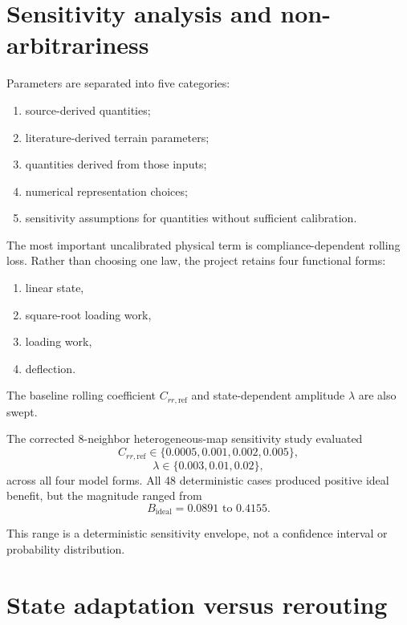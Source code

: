 \documentclass[11pt]{article}
\begin{document}
\section{Sensitivity analysis and non-arbitrariness}

Parameters are separated into five categories:
\begin{enumerate}[label=(\arabic*)]
\item source-derived quantities;
\item literature-derived terrain parameters;
\item quantities derived from those inputs;
\item numerical representation choices;
\item sensitivity assumptions for quantities without sufficient calibration.
\end{enumerate}

The most important uncalibrated physical term is compliance-dependent rolling loss. Rather than choosing one law, the project retains four functional forms:
\begin{enumerate}[label=(\arabic*)]
\item linear state,
\item square-root loading work,
\item loading work,
\item deflection.
\end{enumerate}
The baseline rolling coefficient $C_{rr,\mathrm{ref}}$ and state-dependent amplitude $\lambda$ are also swept.

The corrected 8-neighbor heterogeneous-map sensitivity study evaluated
\begin{equation}
C_{rr,\mathrm{ref}}
\in\{0.0005,0.001,0.002,0.005\},
\end{equation}
\begin{equation}
\lambda\in\{0.003,0.01,0.02\},
\end{equation}
across all four model forms. All 48 deterministic cases produced positive ideal benefit, but the magnitude ranged from
\begin{equation}
B_{\mathrm{ideal}}=0.0891\text{ to }0.4155.
\end{equation}

This range is a deterministic sensitivity envelope, not a confidence interval or probability distribution.

\section{State adaptation versus rerouting}
\end{document}

